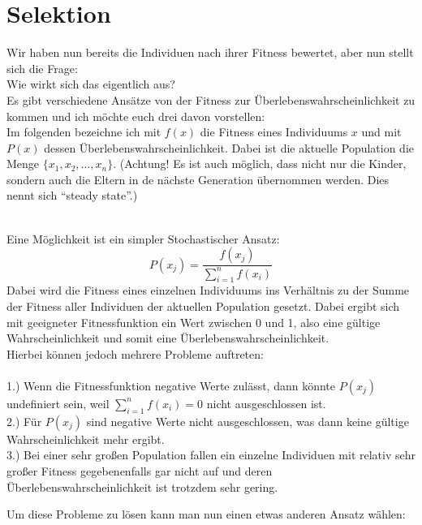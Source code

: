 \section{Selektion}
Wir haben nun bereits die Individuen nach ihrer Fitness bewertet, aber nun stellt sich die Frage:\\
Wie wirkt sich das eigentlich aus?\\
Es gibt verschiedene Ansätze von der Fitness zur Überlebenswahrscheinlichkeit zu kommen und ich möchte euch drei davon vorstellen:\\
Im folgenden bezeichne ich mit $f(x)$ die Fitness eines Individuums $x$ und mit $P(x)$ dessen Überlebenswahrscheinlichkeit. Dabei ist die aktuelle Population die Menge $\{x_1,x_2,\dots,x_n\}$. (Achtung! Es ist auch möglich, dass nicht nur die Kinder, sondern auch die Eltern in de nächste Generation übernommen werden. Dies nennt sich \textquotedblleft steady state\textquotedblright.)
\setcounter{algo}{0}
\begin{algo}\ \\
	Eine Möglichkeit ist ein simpler Stochastischer Ansatz:\\
	$$P(x_j)=\frac{f(x_j)}{\sum_{i=1}^{n}f(x_i)}$$
	Dabei wird die Fitness eines einzelnen Individuums ins Verhältnis zu der Summe der Fitness aller Individuen der aktuellen Population gesetzt. Dabei ergibt sich mit geeigneter Fitnessfunktion ein Wert zwischen 0 und 1, also eine gültige Wahrscheinlichkeit und somit eine Überlebenswahrscheinlichkeit.\\
	Hierbei können jedoch mehrere Probleme auftreten:\\
	\\
	1.) Wenn die Fitnessfunktion negative Werte zulässt, dann könnte $P(x_j)$ undefiniert sein, weil $\sum_{i=1}^{n}f(x_i)=0$ nicht ausgeschlossen ist.\\
	2.) Für $P(x_j)$ sind negative Werte nicht ausgeschlossen, was dann keine gültige Wahrscheinlichkeit mehr ergibt.\\
	3.) Bei einer sehr großen Population fallen ein einzelne Individuen mit relativ sehr großer Fitness gegebenenfalls gar nicht auf und deren Überlebenswahrscheinlichkeit ist trotzdem sehr gering.
\end{algo}
\noindent Um diese Probleme zu lösen kann man nun einen etwas anderen Ansatz wählen:
